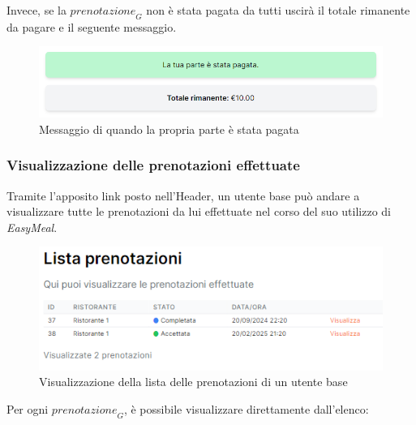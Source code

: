 Invece, se la $\textit{prenotazione}_G$ non è stata pagata da tutti uscirà il totale rimanente da pagare e il seguente messaggio.
\begin{figure}[H]
    \centering
    \includegraphics[width=0.6\linewidth]{img/pagata_parte.png}
    \caption{Messaggio di quando la propria parte è stata pagata}
    \label{fig:pagata_parte}
\end{figure}

\subsubsection{Visualizzazione delle prenotazioni effettuate}
Tramite l'apposito link posto nell'Header, un utente base può andare a visualizzare tutte le prenotazioni da lui effettuate nel corso del suo utilizzo di \textit{EasyMeal}. 
\begin{figure}[H]
    \centering
    \includegraphics[width=0.6\linewidth]{img/lista_prenotazioni_utente.PNG}
    \caption{Visualizzazione della lista delle prenotazioni di un utente base}
\end{figure}
Per ogni $\textit{prenotazione}_G$, è possibile visualizzare direttamente dall'elenco: 
